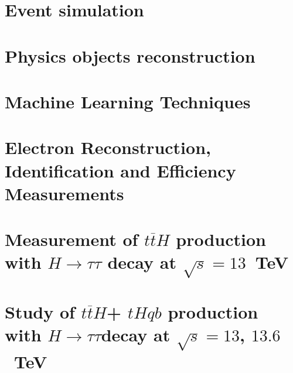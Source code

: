 \documentclass[11pt,twoside]{book}
\newcommand*{\ttH}{\ensuremath{t\overline{t}H}\xspace}
\newcommand*{\thqb}{\ensuremath{tHqb}\xspace}
\newcommand*{\htautau}{\ensuremath{H\to\tau\tau}}\xspace}
\begin{document}
\chapter{Event simulation}
\label{chap:dataset}


\chapter{Physics objects reconstruction}
\label{chap:object_rec}


\chapter{Machine Learning Techniques}
\label{chap:machine_learning}


\chapter{Electron Reconstruction, Identification and Efficiency Measurements}
\label{chap:electrons}


\chapter{Measurement of \ttH production with $H \to \tau \tau$ decay at $\sqrt{s}=13$~TeV}
\label{chap:htautau}



\chapter{Study of \ttH + \thqb production with \htautau decay at $\sqrt{s}=13$, $13.6$~TeV}
\label{chap:run3_tth}

\end{document}
